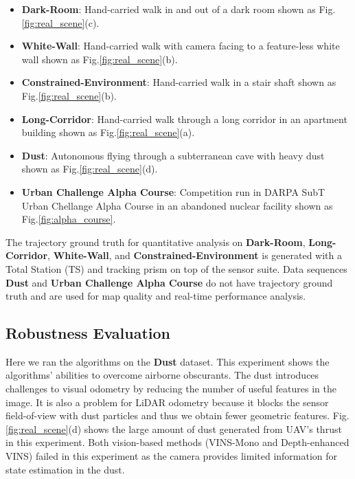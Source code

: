 \begin{itemize}
	\item \textbf{Dark-Room}: Hand-carried walk in and out of a dark room shown as Fig.\ref{fig:real_scene}(c).
	\item \textbf{White-Wall}: Hand-carried walk with camera facing to a feature-less white wall shown as Fig.\ref{fig:real_scene}(b).
	\item \textbf{Constrained-Environment}: Hand-carried walk in a stair shaft shown as Fig.\ref{fig:real_scene}(b). 
	
	
	\item \textbf{Long-Corridor}: Hand-carried walk through a long corridor in an apartment building shown as Fig.\ref{fig:real_scene}(a). 
	\item \textbf{Dust}: Autonomous flying through a subterranean cave with heavy dust shown as Fig.\ref{fig:real_scene}(d).
	\item \textbf{Urban Challenge Alpha Course}: Competition run in DARPA SubT Urban Chellange Alpha Course in an abandoned nuclear facility shown as Fig.\ref{fig:alpha_course}.
\end{itemize}

The trajectory ground truth for quantitative analysis on \textbf{Dark-Room}, \textbf{Long-Corridor}, \textbf{White-Wall}, and 
\textbf{Constrained-Environment} is generated with a Total Station (TS) and tracking prism on top of the sensor suite.
Data sequences \textbf{Dust} and \textbf{Urban Challenge Alpha Course} do not have trajectory ground truth and are used for map quality and 
real-time performance analysis.


\subsection{Robustness Evaluation} 
Here we ran the algorithms on the \textbf{Dust} dataset. This experiment shows the algorithms' abilities to overcome airborne obscurants. The dust introduces challenges to visual odometry by reducing the number of useful features in the image. It is also a problem for LiDAR odometry because it blocks the sensor field-of-view with dust particles and thus we obtain fewer geometric features. Fig.\ref{fig:real_scene}(d) shows the large amount of dust generated from UAV's thrust in this experiment. Both vision-based methods (VINS-Mono and Depth-enhanced VINS) failed in this experiment as the camera provides limited information for state estimation
in the dust.

